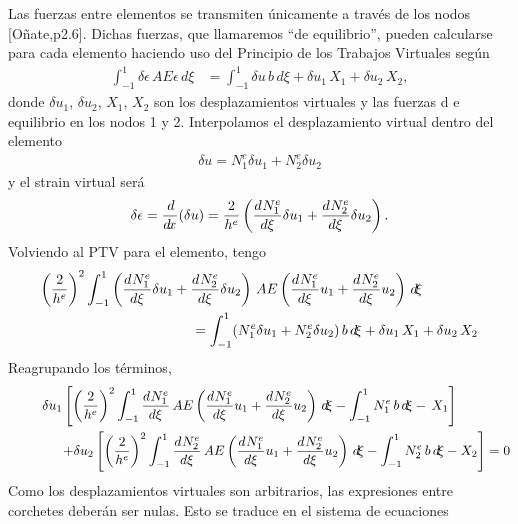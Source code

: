 \documentclass[a4paper,11pt,oneside]{article}
\begin{document}
Las fuerzas entre elementos se transmiten únicamente a través de los nodos [Oñate,p2.6].
Dichas fuerzas, que llamaremos ``de equilibrio'', pueden calcularse para cada elemento
haciendo uso del Principio de los Trabajos Virtuales según
\begin{align*}
  \int_{-1}^{1} \delta\epsilon\,A E\epsilon \,d\!\xi   &= \int_{-1}^{1} \delta u\,b\,d\!\xi + \delta u_1\, X_1 + \delta u_2\, X_2 ,
\end{align*}
donde $\delta u_1$, $\delta u_2$, $X_1$, $X_2$ son los desplazamientos virtuales y las fuerzas d e equilibrio en los nodos 1 y 2. Interpolamos el desplazamiento virtual dentro del elemento
\begin{align*}
  \delta u = N_1^e \delta u_1 + N_2^e \delta u_2
\end{align*}
y el strain virtual será
\begin{align*}
  \delta \epsilon = \frac{d^{}\!}{d\!x^{}}(\delta u) = \frac{2}{h^e}\left( \frac{d^{}N_1^e}{d{\xi}^{}} \delta u_1 + \frac{d^{}N_2^e}{d{\xi}^{}} \delta u_2 \right).
\end{align*}
Volviendo al PTV para el elemento, tengo
\begin{align*}
 \begin{split}
    \left(\frac{2}{h^e}\right)^2 \int_{-1}^{1} \left(\frac{d^{}N_1^e}{d{\xi}^{}}\delta u_1+\frac{d^{}N_2^e}{d{\xi}^{}}\delta u_2\right)
         \,A E \left(\frac{d^{}N_1^e}{d{\xi}^{}}u_1+\frac{d^{}N_2^e}{d{\xi}^{}}u_2\right) \,d\!\xi  \qquad \qquad\\ \qquad \qquad
    = \int_{-1}^{1}(N_1^e \delta u_1 + N_2^e \delta u_2) \,b\,d\!\xi + \delta u_1\, X_1 + \delta u_2\, X_2
  \end{split}
\end{align*}
Reagrupando los términos,
\begin{align*}
 \begin{split}
   \delta u_1 \left[ \left(\frac{2}{h^e}\right)^2 \int_{-1}^{1} \frac{d^{}N_1^e}{d{\xi}^{}}
         \,A E \left(\frac{d^{}N_1^e}{d{\xi}^{}}u_1+\frac{d^{}N_2^e}{d{\xi}^{}}u_2\right) \,d\!\xi
         - \int_{-1}^{1}N_1^e \,b\,d\!\xi - \, X_1 \right] \qquad \qquad\\ \qquad \qquad
    + \delta u_2 \left[ \left(\frac{2}{h^e}\right)^2 \int_{-1}^{1} \frac{d^{}N_2^e}{d{\xi}^{}}
         \,A E \left(\frac{d^{}N_1^e}{d{\xi}^{}}u_1+\frac{d^{}N_2^e}{d{\xi}^{}}u_2\right) \,d\!\xi
         - \int_{-1}^{1}N_2^e \,b\,d\!\xi -  X_2 \right] =0
 \end{split}
\end{align*}
Como los desplazamientos virtuales son arbitrarios, las expresiones entre corchetes deberán
ser nulas. Esto se traduce en el sistema de ecuaciones
\end{document}
